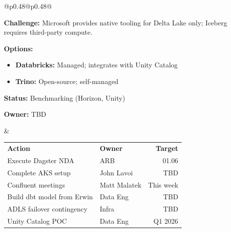 \documentclass[10pt, a4paper]{article}
\begin{document}
{\begin{tabular}[t]{@{}p{}@{\hspace{0.02\textwidth}}p{}@{}}
\vspace{0.3em}

\begin{tikzpicture}
    \node[fill=kiporange!20, rounded corners=3pt, inner sep=3pt, text width=\linewidth-6pt, align=left] {\textbf{Research Item: Azure Compute over Iceberg}};
\end{tikzpicture}

\vspace{0.1em}

{\footnotesize
\textbf{Challenge:} Microsoft provides native tooling for Delta Lake only; Iceberg requires third-party compute.

\vspace{0.1em}

\textbf{Options:}
\begin{itemize}[leftmargin=1em, itemsep=0em]
    \item \textbf{Databricks:} Managed; integrates with Unity Catalog
    \item \textbf{Trino:} Open-source; self-managed
\end{itemize}

\vspace{0.1em}

\textbf{Status:} Benchmarking (Horizon, Unity)

\textbf{Owner:} TBD
}

&
\vspace{0pt}
\raggedright

\begin{tikzpicture}
    \node[fill=kipgreen!20, rounded corners=3pt, inner sep=3pt, text width=\linewidth-6pt, align=left] {\textbf{Immediate Next Steps}};
\end{tikzpicture}

\vspace{0.1em}

{\footnotesize
\renewcommand{\arraystretch}{1.3}
\begin{tabularx}{\linewidth}{@{}Xlr@{}}
\rowcolor{black!10}
\textbf{Action} & \textbf{Owner} & \textbf{Target} \\
\rowcolor{white}
Execute Dagster NDA & ARB & 01.06 \\
\rowcolor{black!5}
Complete AKS setup & John Lavoi & TBD \\
\rowcolor{white}
Confluent meetings & Matt Malatek & This week \\
\rowcolor{black!5}
Build dbt model from Erwin & Data Eng & TBD \\
\rowcolor{white}
ADLS failover contingency & Infra & TBD \\
\rowcolor{black!5}
Unity Catalog POC & Data Eng & Q1 2026 \\
\end{tabularx}
\renewcommand{\arraystretch}{1.0}
}


\end{tabular}}
\end{document}
